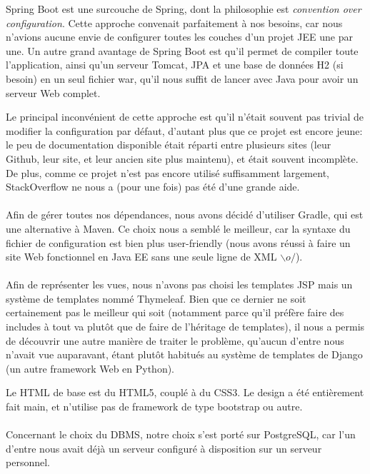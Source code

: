 \documentclass[10pt]{scrartcl}
\begin{document}
  Spring Boot est une surcouche de Spring, dont la philosophie est
  \emph{convention over configuration}. Cette approche convenait
  parfaitement à nos besoins, car nous n'avions aucune envie de
  configurer toutes les couches d'un projet JEE une par une. Un autre
  grand avantage de Spring Boot est qu'il permet de compiler toute
  l'application, ainsi qu'un serveur Tomcat, JPA et une base de
  données H2 (si besoin) en un seul fichier war, qu'il nous suffit de
  lancer avec Java pour avoir un serveur Web complet.

  Le principal inconvénient de cette approche est qu'il n'était
  souvent pas trivial de modifier la configuration par défaut,
  d'autant plus que ce projet est encore jeune: le peu de
  documentation disponible était réparti entre plusieurs sites (leur
  Github, leur site, et leur ancien site plus maintenu), et était
  souvent incomplète. De plus, comme ce projet n'est pas encore
  utilisé suffisamment largement, StackOverflow ne nous a (pour une
  fois) pas été d'une grande aide.

  \paragraph{}
  Afin de gérer toutes nos dépendances, nous avons décidé d'utiliser
  Gradle, qui est une alternative à Maven. Ce choix nous a semblé le
  meilleur, car la syntaxe du fichier de configuration est bien plus
  user-friendly (nous avons réussi à faire un site Web fonctionnel en
  Java EE sans une seule ligne de XML $\backslash o/$).

  \paragraph{}
  Afin de représenter les vues, nous n'avons pas choisi les templates JSP
  mais un système de templates nommé Thymeleaf. Bien que ce dernier
  ne soit certainement pas le meilleur qui soit (notamment parce
  qu'il préfère faire des includes à tout va plutôt que de faire de
  l'héritage de templates), il nous a permis de découvrir une autre
  manière de traiter le problème, qu'aucun d'entre nous n'avait vue
  auparavant, étant plutôt habitués au système de templates de Django
  (un autre framework Web en Python).

  Le HTML de base est du HTML5, couplé à du CSS3. Le design a été
  entièrement fait main, et n'utilise pas de framework de type
  bootstrap ou autre.

  \paragraph{}
  Concernant le choix du DBMS, notre choix s'est porté sur
  PostgreSQL, car l'un d'entre nous avait déjà un serveur configuré à
  disposition sur un serveur personnel.
\end{document}
